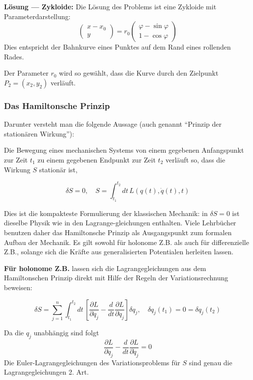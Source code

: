 \documentclass[10pt, letterpaper]{article}
\begin{document}
\textbf{Lösung — Zykloide:} Die Lösung des Problems ist eine Zykloide mit Parameterdarstellung:
\[
\begin{pmatrix} x - x_0 \\ y \end{pmatrix}
= r_0 \begin{pmatrix} \varphi - \sin\varphi \\ 1 - \cos\varphi \end{pmatrix}
\]
Dies entspricht der Bahnkurve eines Punktes auf dem Rand eines rollenden Rades.

Der Parameter $r_0$ wird so gewählt, dass die Kurve durch den Zielpunkt $P_2 = (x_2, y_2)$ verläuft.



\subsubsection{Das Hamiltonsche Prinzip} 

Darunter versteht man die folgende Aussage (auch genannt ``Prinzip der stationären Wirkung''):

Die Bewegung eines mechanischen Systems von einem gegebenen Anfangspunkt zur Zeit $t_1$ zu einem gegebenen Endpunkt zur Zeit $t_2$ verläuft so, dass die Wirkung $S$ stationär ist,

\[\delta S = 0, \quad S = \int_{t_1}^{t_2} dt\, L(q(t), \dot{q}(t), t)\]

Dies ist die kompakteste Formulierung der klassischen Mechanik: in $\delta S = 0$ ist dieselbe Physik wie in den Lagrange-gleichungen enthalten. Viele Lehrbücher benutzen daher das Hamiltonsche Prinzip als Ausgangspunkt zum formalen Aufbau der Mechanik. Es gilt sowohl für holonome Z.B. als auch für differenzielle Z.B., solange sich die Kräfte aus generalisierten Potentialen herleiten lassen.


\textbf{Für holonome Z.B.} lassen sich die Lagrangegleichungen aus dem Hamiltonschen Prinzip direkt mit Hilfe der Regeln der Variationsrechnung beweisen:

\[\delta S = \sum_{j=1}^n \int_{t_1}^{t_2} dt\, \left[\frac{\partial L}{\partial q_j} - \frac{d}{dt}\frac{\partial L}{\partial \dot{q}_j}\right]\delta q_j, \quad \delta q_j(t_1) = 0 = \delta q_j(t_2)\]

Da die $q_j$ unabhängig sind folgt 
$$\frac{\partial L}{\partial q_j} - \frac{d}{dt}\frac{\partial L}{\partial \dot{q}_j} = 0$$
Die Euler-Lagrangegleichungen des Variationsproblems für $S$ sind genau die Lagrangegleichungen 2. Art.
\end{document}
